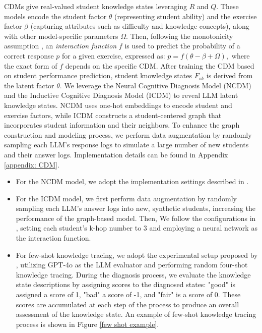 \label{appendix: CDM}
CDMs give real-valued student knowledge states leveraging \(R\) and \(Q\). These models encode the student factor \(\theta\) (representing student ability) and the exercise factor \(\beta\) (capturing attributes such as difficulty and knowledge concepts), along with other model-specific parameters \(\Omega\). Then, following the monotonicity assumption \citep{ackerman2014multidimensional}, an \emph{interaction function} \(f\) is used to predict the probability of a correct response \(p\) for a given exercise, expressed as:
    \( p = f(\theta - \beta + \Omega),\) 
where the exact form of \(f\) depends on the specific CDM. After training the CDM based on student performance prediction, student knowledge states \(F_{sk}\) is derived from the latent factor \(\theta\). 
We leverage the Neural Cognitive Diagnosis Model (NCDM) \citep{wang2020neural} and the Inductive Cognitive Diagnosis Model (ICDM) \citep{liu2024inductive} to reveal LLM latent knowledge states. NCDM uses one-hot embeddings to encode student and exercise factors, while ICDM constructs a student-centered graph that incorporates student information and their neighbors. To enhance the graph construction and modeling process, we perform data augmentation by randomly sampling each LLM's response logs to simulate a large number of new students and their answer logs. Implementation details can be found in Appendix \ref{appendix: CDM}. 

\begin{itemize}[nolistsep, leftmargin=*]
    \item For the NCDM model, we adopt the implementation settings described in \citet{wang2020neural}.
    \item For the ICDM model, we first perform data augmentation by randomly sampling each LLM's answer logs into new, synthetic students, increasing the performance of the graph-based model. Then, We follow the configurations in \citet{liu2024inductive}, setting each student's k-hop number to 3 and employing a neural network as the interaction function.
    
    \item For few-shot knowledge tracing, we adopt the experimental setup proposed by \citet{li2024explainable}, utilizing GPT-4o as the LLM evaluator and performing random four-shot knowledge tracing. During the diagnosis process, we evaluate the knowledge state descriptions by assigning scores to the diagnosed states: "good" is assigned a score of 1, "bad" a score of -1, and "fair" is a score of 0. These scores are accumulated at each step of the process to produce an overall assessment of the knowledge state. An example of few-shot knowledge tracing process is shown in Figure \ref{few shot example}.
    
\end{itemize}


